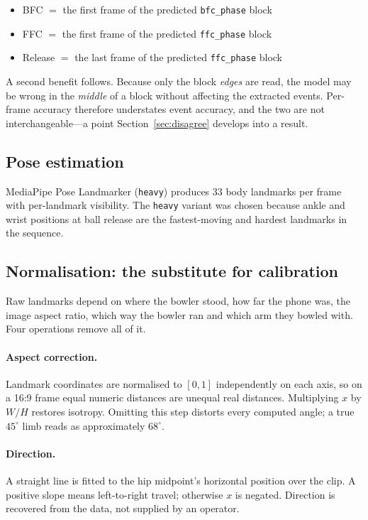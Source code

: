 \documentclass[11pt,a4paper]{article}
\begin{document}
\begin{itemize}
  \item BFC $=$ the first frame of the predicted \texttt{bfc\_phase} block
  \item FFC $=$ the first frame of the predicted \texttt{ffc\_phase} block
  \item Release $=$ the last frame of the predicted \texttt{ffc\_phase} block
\end{itemize}

A second benefit follows. Because only the block \emph{edges} are read, the
model may be wrong in the \emph{middle} of a block without affecting the
extracted events. Per-frame accuracy therefore understates event accuracy, and
the two are not interchangeable---a point Section~\ref{sec:disagree} develops
into a result.

\subsection{Pose estimation}

MediaPipe Pose Landmarker (\texttt{heavy}) produces 33 body landmarks per
frame with per-landmark visibility. The \texttt{heavy} variant was chosen
because ankle and wrist positions at ball release are the fastest-moving and
hardest landmarks in the sequence.

\subsection{Normalisation: the substitute for calibration}

Raw landmarks depend on where the bowler stood, how far the phone was, the
image aspect ratio, which way the bowler ran and which arm they bowled with.
Four operations remove all of it.

\paragraph{Aspect correction.} Landmark coordinates are normalised to $[0,1]$
independently on each axis, so on a 16:9 frame equal numeric distances are
unequal real distances. Multiplying $x$ by $W/H$ restores isotropy. Omitting
this step distorts every computed angle; a true $45^\circ$ limb reads as
approximately $68^\circ$.

\paragraph{Direction.} A straight line is fitted to the hip midpoint's
horizontal position over the clip. A positive slope means left-to-right travel;
otherwise $x$ is negated. Direction is recovered from the data, not supplied by
an operator.
\end{document}
